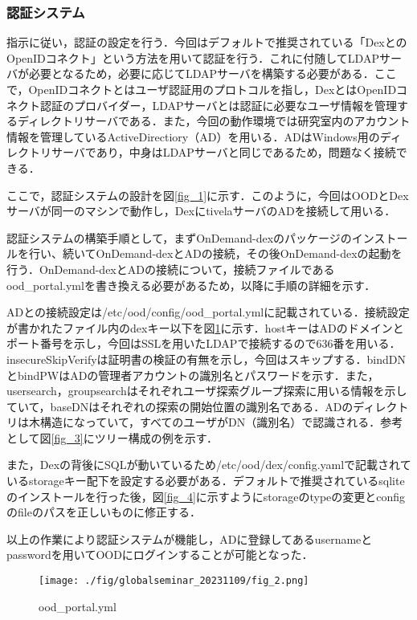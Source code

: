 \documentclass[a4paper,oneside,twocolumn,notitlepage,dvipdfmx]{jsarticle}
\begin{document}
\subsubsection{認証システム}
指示に従い，認証の設定を行う．今回はデフォルトで推奨されている「DexとのOpenIDコネクト」という方法を用いて認証を行う．これに付随してLDAPサーバが必要となるため，必要に応じてLDAPサーバを構築する必要がある．ここで，OpenIDコネクトとはユーザ認証用のプロトコルを指し，DexとはOpenIDコネクト認証のプロバイダー，LDAPサーバとは認証に必要なユーザ情報を管理するディレクトリサーバである．また，今回の動作環境では研究室内のアカウント情報を管理しているActiveDirectiory（AD）を用いる．ADはWindows用のディレクトリサーバであり，中身はLDAPサーバと同じであるため，問題なく接続できる．\par
ここで，認証システムの設計を図\ref{fig_1}に示す．このように，今回はOODとDexサーバが同一のマシンで動作し，DexにtivelaサーバのADを接続して用いる．\par
認証システムの構築手順として，まずOnDemand-dexのパッケージのインストールを行い、続いてOnDemand-dexとADの接続，その後OnDemand-dexの起動を行う．OnDemand-dexとADの接続について，接続ファイルであるood\_portal.ymlを書き換える必要があるため，以降に手順の詳細を示す．\par
ADとの接続設定は/etc/ood/config/ood\_portal.ymlに記載されている．接続設定が書かれたファイル内のdexキー以下を図\ref{fig_2}に示す．hostキーはADのドメインとポート番号を示し，今回はSSLを用いたLDAPで接続するので636番を用いる．insecureSkipVerifyは証明書の検証の有無を示し，今回はスキップする．bindDNとbindPWはADの管理者アカウントの識別名とパスワードを示す．また，usersearch，groupsearchはそれぞれユーザ探索グループ探索に用いる情報を示していて，baseDNはそれぞれの探索の開始位置の識別名である．ADのディレクトリは木構造になっていて，すべてのユーザがDN（識別名）で認識される．参考として図\ref{fig_3}にツリー構成の例を示す．\par
また，Dexの背後にSQLが動いているため/etc/ood/dex/config.yamlで記載されているstorageキー配下を設定する必要がある．デフォルトで推奨されているsqliteのインストールを行った後，図\ref{fig_4}に示すようにstorageのtypeの変更とconfigのfileのパスを正しいものに修正する．\par
以上の作業により認証システムが機能し，ADに登録してあるusernameとpasswordを用いてOODにログインすることが可能となった．\par

\begin{figure}[h]
  \centering
  \texttt{[image: ./fig/globalseminar\_20231109/fig\_2.png]}
  \caption{ood\_portal.yml}
  \label{fig_2}
\end{figure}
\end{document}
